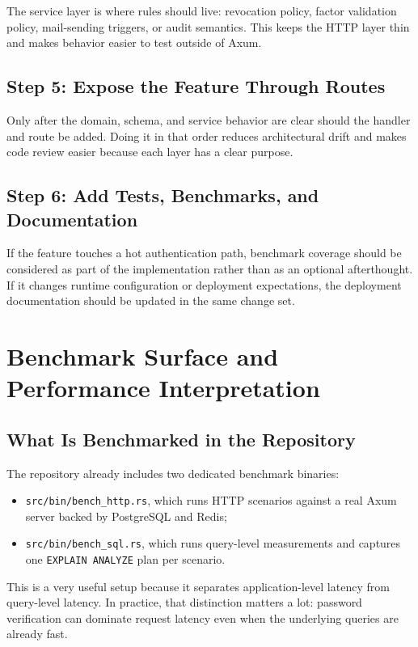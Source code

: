 \documentclass[11pt,a4paper]{article}
\begin{document}
The service layer is where rules should live: revocation policy, factor validation policy, mail-sending triggers, or audit semantics. This keeps the HTTP layer thin and makes behavior easier to test outside of Axum.

\subsection{Step 5: Expose the Feature Through Routes}

Only after the domain, schema, and service behavior are clear should the handler and route be added. Doing it in that order reduces architectural drift and makes code review easier because each layer has a clear purpose.

\subsection{Step 6: Add Tests, Benchmarks, and Documentation}

If the feature touches a hot authentication path, benchmark coverage should be considered as part of the implementation rather than as an optional afterthought. If it changes runtime configuration or deployment expectations, the deployment documentation should be updated in the same change set.

\section{Benchmark Surface and Performance Interpretation}

\subsection{What Is Benchmarked in the Repository}

The repository already includes two dedicated benchmark binaries:

\begin{itemize}
  \item \texttt{src/bin/bench\_http.rs}, which runs HTTP scenarios against a real Axum server backed by PostgreSQL and Redis;
  \item \texttt{src/bin/bench\_sql.rs}, which runs query-level measurements and captures one \texttt{EXPLAIN ANALYZE} plan per scenario.
\end{itemize}

This is a very useful setup because it separates application-level latency from query-level latency. In practice, that distinction matters a lot: password verification can dominate request latency even when the underlying queries are already fast.
\end{document}
